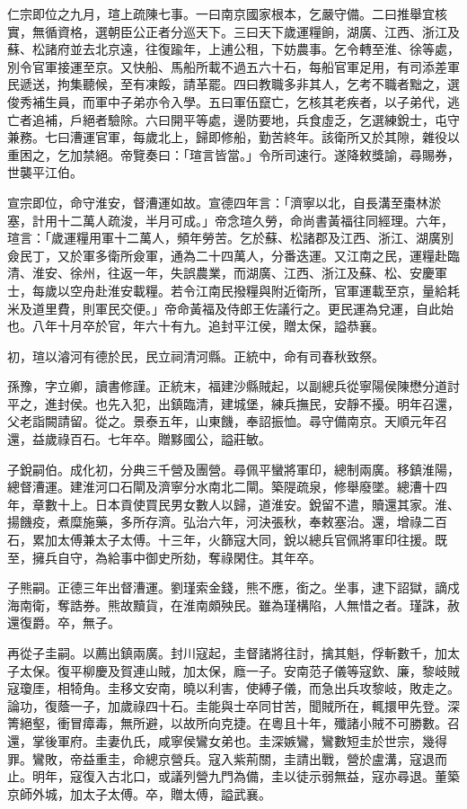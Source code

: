 \begin{pinyinscope}
仁宗即位之九月，瑄上疏陳七事。一曰南京國家根本，乞嚴守備。二曰推舉宜核實，無循資格，選朝臣公正者分巡天下。三曰天下歲運糧餉，湖廣、江西、浙江及蘇、松諸府並去北京遠，往復踰年，上逋公租，下妨農事。乞令轉至淮、徐等處，別令官軍接運至京。又快船、馬船所載不過五六十石，每船官軍足用，有司添差軍民遞送，拘集聽候，至有凍餒，請革罷。四曰教職多非其人，乞考不職者黜之，選俊秀補生員，而軍中子弟亦令入學。五曰軍伍竄亡，乞核其老疾者，以子弟代，逃亡者追補，戶絕者驗除。六曰開平等處，邊防要地，兵食虛乏，乞選練銳士，屯守兼務。七曰漕運官軍，每歲北上，歸即修船，勤苦終年。該衛所又於其隙，雜役以重困之，乞加禁絕。帝覽奏曰：「瑄言皆當。」令所司速行。遂降敕獎諭，尋賜券，世襲平江伯。

宣宗即位，命守淮安，督漕運如故。宣德四年言：「濟寧以北，自長溝至棗林淤塞，計用十二萬人疏浚，半月可成。」帝念瑄久勞，命尚書黃福往同經理。六年，瑄言：「歲運糧用軍十二萬人，頻年勞苦。乞於蘇、松諸郡及江西、浙江、湖廣別僉民丁，又於軍多衛所僉軍，通為二十四萬人，分番迭運。又江南之民，運糧赴臨清、淮安、徐州，往返一年，失誤農業，而湖廣、江西、浙江及蘇、松、安慶軍士，每歲以空舟赴淮安載糧。若令江南民撥糧與附近衛所，官軍運載至京，量給耗米及道里費，則軍民交便。」帝命黃福及侍郎王佐議行之。更民運為兌運，自此始也。八年十月卒於官，年六十有九。追封平江侯，贈太保，謚恭襄。

初，瑄以濬河有德於民，民立祠清河縣。正統中，命有司春秋致祭。

孫豫，字立卿，讀書修謹。正統末，福建沙縣賊起，以副總兵從寧陽侯陳懋分道討平之，進封侯。也先入犯，出鎮臨清，建城堡，練兵撫民，安靜不擾。明年召還，父老詣闕請留。從之。景泰五年，山東饑，奉詔振恤。尋守備南京。天順元年召還，益歲祿百石。七年卒。贈黟國公，謚莊敏。

子銳嗣伯。成化初，分典三千營及團營。尋佩平蠻將軍印，總制兩廣。移鎮淮陽，總督漕運。建淮河口石閘及濟寧分水南北二閘。築隄疏泉，修舉廢墜。總漕十四年，章數十上。日本貢使買民男女數人以歸，道淮安。銳留不遣，贖還其家。淮、揚饑疫，煮糜施藥，多所存濟。弘治六年，河決張秋，奉敕塞治。還，增祿二百石，累加太傅兼太子太傅。十三年，火篩寇大同，銳以總兵官佩將軍印往援。既至，擁兵自守，為給事中御史所劾，奪祿閑住。其年卒。

子熊嗣。正德三年出督漕運。劉瑾索金錢，熊不應，銜之。坐事，逮下詔獄，謫戍海南衛，奪誥券。熊故黷貨，在淮南頗殃民。雖為瑾構陷，人無惜之者。瑾誅，赦還復爵。卒，無子。

再從子圭嗣。以薦出鎮兩廣。封川寇起，圭督諸將往討，擒其魁，俘斬數千，加太子太保。復平柳慶及賀連山賊，加太保，廕一子。安南范子儀等寇欽、廉，黎岐賊寇瓊厓，相犄角。圭移文安南，曉以利害，使縛子儀，而急出兵攻黎岐，敗走之。論功，復蔭一子，加歲祿四十石。圭能與士卒同甘苦，聞賊所在，輒擐甲先登。深箐絕壑，衝冒瘴毒，無所避，以故所向克捷。在粵且十年，殲諸小賊不可勝數。召還，掌後軍府。圭妻仇氏，咸寧侯鸞女弟也。圭深嫉鸞，鸞數短圭於世宗，幾得罪。鸞敗，帝益重圭，命總京營兵。寇入紫荊關，圭請出戰，營於盧溝，寇退而止。明年，寇復入古北口，或議列營九門為備，圭以徒示弱無益，寇亦尋退。董築京師外城，加太子太傅。卒，贈太傅，謚武襄。


\end{pinyinscope}
